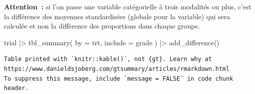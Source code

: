 \documentclass[
  letterpaper,
  DIV=11,
  numbers=noendperiod,
  oneside]{scrreprt}
\newenvironment{Shaded}{\begin{snugshade}}{\end{snugshade}}
\newcommand{\AttributeTok}[1]{\textcolor[rgb]{0.40,0.45,0.13}{#1}}
\newcommand{\FunctionTok}[1]{\textcolor[rgb]{0.28,0.35,0.67}{#1}}
\newcommand{\NormalTok}[1]{\textcolor[rgb]{0.00,0.23,0.31}{#1}}
\newcommand{\SpecialCharTok}[1]{\textcolor[rgb]{0.37,0.37,0.37}{#1}}
\begin{document}
\textbf{Attention~:} si l'on passe une variable catégorielle à trois
modalités ou plus, c'est la différence des moyennes standardisées
(globale pour la variable) qui sera calculée et non la différence des
proportions dans chaque groupe.

\begin{Shaded}
\begin{Highlighting}[]
\NormalTok{trial }\SpecialCharTok{|\textgreater{}} 
  \FunctionTok{tbl\_summary}\NormalTok{(}
    \AttributeTok{by =}\NormalTok{ trt,}
    \AttributeTok{include =}\NormalTok{ grade}
\NormalTok{  ) }\SpecialCharTok{|\textgreater{}} 
  \FunctionTok{add\_difference}\NormalTok{()}
\end{Highlighting}
\end{Shaded}

\begin{verbatim}
Table printed with `knitr::kable()`, not {gt}. Learn why at
https://www.danieldsjoberg.com/gtsummary/articles/rmarkdown.html
To suppress this message, include `message = FALSE` in code chunk header.
\end{verbatim}
\end{document}
